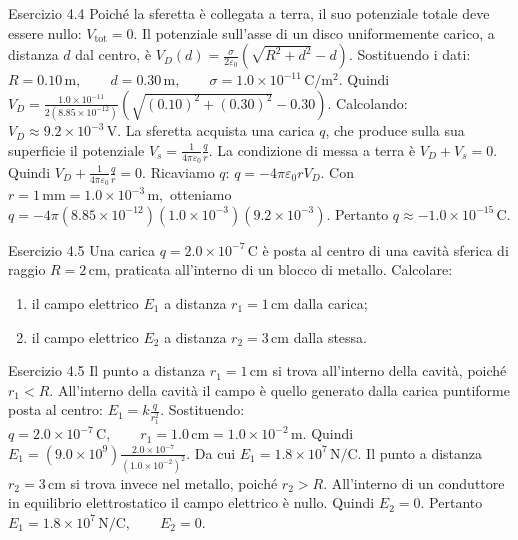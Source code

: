 \documentclass[a4paper]{article}
\begin{document}
\begin{snippetsolution}{Esercizio 4.4}
    Poiché la sferetta è collegata a terra, il suo potenziale totale deve
    essere nullo:
    \(V_{\mathrm{tot}} = 0.\)
    Il potenziale sull'asse di un disco uniformemente carico, a distanza \(d\)
    dal centro, è
    \(V_D(d) = \frac{\sigma}{2\varepsilon_0} \left( \sqrt{R^2+d^2} - d \right).\)
    Sostituendo i dati:
    \(R = 0.10\,\mathrm{m}, \qquad d = 0.30\,\mathrm{m}, \qquad \sigma = 1.0 \times 10^{-11}\,\mathrm{C/m^2}.\)
    Quindi
    \(V_D = \frac{1.0 \times 10^{-11}} {2(8.85 \times 10^{-12})} \left( \sqrt{(0.10)^2+(0.30)^2} - 0.30 \right).\)
    Calcolando:
    \(V_D \approx 9.2 \times 10^{-3}\,\mathrm{V}.\)
    La sferetta acquista una carica \(q\), che produce sulla sua superficie il
    potenziale
    \(V_s = \frac{1}{4\pi\varepsilon_0}\frac{q}{r}.\)
    La condizione di messa a terra è
    \(V_D + V_s = 0.\)
    Quindi
    \(V_D + \frac{1}{4\pi\varepsilon_0}\frac{q}{r} = 0.\)
    Ricaviamo \(q\):
    \(q = -4\pi\varepsilon_0 r V_D.\)
    Con
    \(r = 1\,\mathrm{mm} = 1.0 \times 10^{-3}\,\mathrm{m},\)
    otteniamo
    \(q = -4\pi \left(8.85 \times 10^{-12}\right) \left(1.0 \times 10^{-3}\right) \left(9.2 \times 10^{-3}\right).\)
    Pertanto
    \(\boxed{q \approx -1.0 \times 10^{-15}\,\mathrm{C}}.\)
\end{snippetsolution}
\begin{snippetexercise}{Esercizio 4.5}
    Una carica \(q = 2.0 \times 10^{-7}\,\mathrm{C}\) è posta al centro di una
    cavità sferica di raggio \(R = 2\,\mathrm{cm}\), praticata all'interno di
    un blocco di metallo. Calcolare:
    \begin{enumerate}[nosep]
        \item il campo elettrico \(E_1\) a distanza
        \(r_1 = 1\,\mathrm{cm}\) dalla carica;
        \item il campo elettrico \(E_2\) a distanza
        \(r_2 = 3\,\mathrm{cm}\) dalla stessa.
    \end{enumerate}
\end{snippetexercise}
\begin{snippetsolution}{Esercizio 4.5}
    Il punto a distanza \(r_1 = 1\,\mathrm{cm}\) si trova all'interno della
    cavità, poiché
    \(r_1 < R.\)
    All'interno della cavità il campo è quello generato dalla carica puntiforme
    posta al centro:
    \(E_1 = k\frac{q}{r_1^2}.\)
    Sostituendo:
    \(q = 2.0 \times 10^{-7}\,\mathrm{C}, \qquad r_1 = 1.0\,\mathrm{cm} = 1.0 \times 10^{-2}\,\mathrm{m}.\)
    Quindi
    \(E_1 = \left(9.0 \times 10^9\right) \frac{2.0 \times 10^{-7}} {\left(1.0 \times 10^{-2}\right)^2}.\)
    Da cui
    \(E_1 = 1.8 \times 10^7\,\mathrm{N/C}.\)
    Il punto a distanza \(r_2 = 3\,\mathrm{cm}\) si trova invece nel metallo,
    poiché
    \(r_2 > R.\)
    All'interno di un conduttore in equilibrio elettrostatico il campo elettrico
    è nullo. Quindi
    \(E_2 = 0.\)
    Pertanto
    \(\boxed{E_1 = 1.8 \times 10^7\,\mathrm{N/C}}, \qquad \boxed{E_2 = 0}.\)
\end{snippetsolution}
\end{document}
